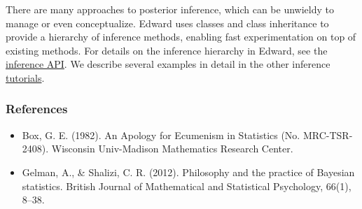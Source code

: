 There are many approaches to posterior inference, which can be unwieldy to
manage or even conceptualize. Edward uses classes and class
inheritance to provide a hierarchy of inference methods, enabling fast
experimentation on top of existing methods. For details on the inference
hierarchy in Edward, see the
\href{api/inferences}{inference API}. We describe several examples in
detail in the other inference \href{tutorials}{tutorials}.


\subsubsection{References}\label{references}

\begin{itemize}
\item
  Box, G. E. (1982). An Apology for Ecumenism in Statistics (No.
  MRC-TSR-2408). Wisconsin Univ-Madison Mathematics Research Center.
\item
  Gelman, A., & Shalizi, C. R. (2012). Philosophy and the practice of
  Bayesian statistics. British Journal of Mathematical and Statistical
  Psychology, 66(1), 8–38.
\end{itemize}
